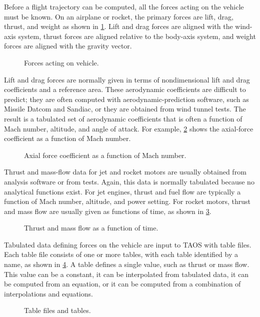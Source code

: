 Before a flight trajectory can be computed, all the forces acting on the vehicle must
be known. On an airplane or rocket, the primary forces are lift, drag, thrust, and
weight as shown in \cref{fig:forces-acting-on-vehicle}. Lift and drag forces are
aligned with the wind-axis system, thrust forces are aligned relative to the body-axis
system, and weight forces are aligned with the gravity vector.

\begin{figure}[htbp]
  \centering
  
  \caption{Forces acting on vehicle.}
  \label{fig:forces-acting-on-vehicle}
\end{figure}

Lift and drag forces are normally given in terms of nondimensional lift and drag
coefficients and a reference area. These aerodynamic coefficients are difficult to
predict; they are often computed with aerodynamic-prediction software, such as
Missile Datcom and Sandiac, or they are obtained from wind
tunnel tests. The result is a tabulated set of aerodynamic coefficients that is often a
function of Mach number, altitude, and angle of attack. For example,
\cref{fig:axial-force-mach} shows the axial-force coefficient as a function of Mach
number.

\begin{figure}[htbp]
  \centering
  
  \caption{Axial force coefficient as a function of Mach number.}
  \label{fig:axial-force-mach}
\end{figure}

Thrust and mass-flow data for jet and rocket motors are usually obtained from
analysis software or from tests. Again, this data is normally tabulated because no
analytical functions exist. For jet engines, thrust and fuel flow are typically a
function of Mach number, altitude, and power setting. For rocket motors, thrust and
mass flow are usually given as functions of time, as shown in
\cref{fig:thrust-mass-flow-time}.

\begin{figure}[htbp]
  \centering
  
  \caption{Thrust and mass flow as a function of time.}
  \label{fig:thrust-mass-flow-time}
\end{figure}

Tabulated data defining forces on the vehicle are input to TAOS with table files.
Each table file consists of one or more tables, with each table identified by a name,
as shown in \cref{fig:table-files-and-tables}. A table defines a single value, such as
thrust or mass flow. This value can be a constant, it can be interpolated from
tabulated data, it can be computed from an equation, or it can be computed from a
combination of interpolations and equations.

\begin{figure}[htbp]
  \centering
  
  \caption{Table files and tables.}
  \label{fig:table-files-and-tables}
\end{figure}
